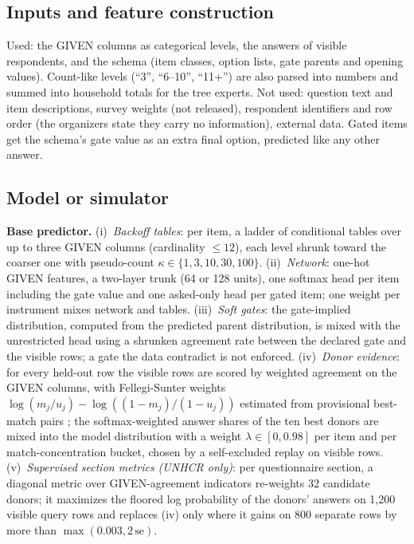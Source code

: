 \documentclass{article}
\begin{document}
\subsection{Inputs and feature construction}
Used: the GIVEN columns as categorical levels, the answers of visible respondents, and the
schema (item classes, option lists, gate parents and opening values). Count-like levels
(``3'', ``6--10'', ``11+'') are also parsed into numbers and summed into household totals
for the tree experts. Not used: question text and item descriptions, survey weights (not
released), respondent identifiers and row order (the organizers state they carry no
information), external data. Gated items get the schema's gate value as an extra final
option, predicted like any other answer.

\subsection{Model or simulator}
\textbf{Base predictor.}
(i)~\emph{Backoff tables}: per item, a ladder of conditional tables over up to three GIVEN
columns (cardinality $\le 12$), each level shrunk toward the coarser one with pseudo-count
$\kappa \in \{1,3,10,30,100\}$.
(ii)~\emph{Network}: one-hot GIVEN features, a two-layer trunk (64 or 128 units), one softmax
head per item including the gate value and one asked-only head per gated item; one
weight per instrument mixes network and tables.
(iii)~\emph{Soft gates}: the gate-implied distribution, computed from the predicted parent
distribution, is mixed with the unrestricted head using a shrunken agreement rate between
the declared gate and the visible rows; a gate the data contradict is not enforced.
(iv)~\emph{Donor evidence}: for every held-out row the visible rows are scored by weighted
agreement on the GIVEN columns, with Fellegi-Sunter weights $\log(m_j/u_j) -
\log((1-m_j)/(1-u_j))$ estimated from provisional best-match pairs \citep{fellegi1969};
the softmax-weighted answer shares of the ten best donors are mixed into the model
distribution with a weight $\lambda \in [0, 0.98]$ per item and per match-concentration
bucket, chosen by a self-excluded replay on visible rows.
(v)~\emph{Supervised section metrics (UNHCR only)}: per questionnaire section, a diagonal
metric over GIVEN-agreement indicators re-weights 32 candidate donors; it maximizes the
floored log probability of the donors' answers on 1,200 visible query rows and replaces
(iv) only where it gains on 800 separate rows by more than $\max(0.003, 2\,\mathrm{se})$.
\end{document}
